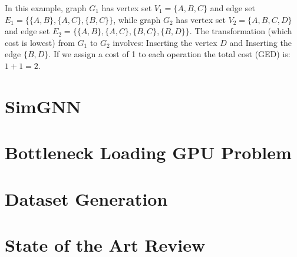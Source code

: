 \documentclass{article}
\begin{document}
In this example, graph $G_1$ has vertex set $V_1 = \{A, B, C\}$ and edge set $E_1 = \{\{A, B\}, \{A, C\}, \{B, C\}\}$, while graph $G_2$ has vertex set $V_2 = \{A, B, C, D\}$ and edge set $E_2 = \{\{A, B\}, \{A, C\}, \{B, C\}, \{B, D\}\}$. The transformation (which cost is lowest) from $G_1$ to $G_2$ involves: Inserting the vertex $D$ and Inserting the edge $\{B, D\}$. If we assign a cost of 1 to each operation the total cost (GED) is: $1+1=2$.

\section{SimGNN}
\section{Bottleneck Loading GPU Problem}
\section{Dataset Generation}
\section{State of the Art Review}




\end{document}
